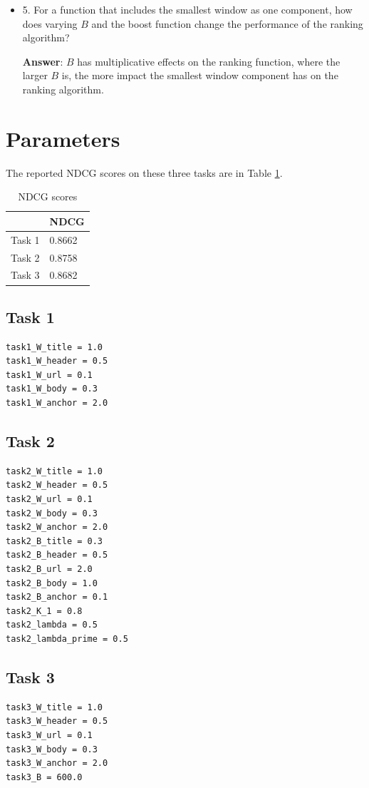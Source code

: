 \begin{itemize}
  
  \item[] 5. For a function that includes the smallest window as one component, how does varying $B$ and the boost function change the performance of the ranking algorithm?
  
  \textbf{Answer}: 
      $B$ has multiplicative effects on the ranking function, where the larger $B$ is, the more impact the smallest window component has on the ranking algorithm.
\end{itemize}

\section{Parameters}

The reported NDCG scores on these three tasks are in Table \ref{tab:ndcg}.
\begin{table}[h!]
\begin{center}
\begin{tabular}{|l|l|}
  \hline
   & NDCG \\
  \hline
  Task 1 & 0.8662 \\
  Task 2 & 0.8758 \\
  Task 3 & 0.8682 \\
  \hline
\end{tabular}
  \caption{NDCG scores}\label{tab:ndcg}
\end{center}
\end{table}

\subsection{Task 1}
\begin{verbatim}
task1_W_title = 1.0
task1_W_header = 0.5
task1_W_url = 0.1
task1_W_body = 0.3
task1_W_anchor = 2.0
\end{verbatim}

\subsection{Task 2}
\begin{verbatim}
task2_W_title = 1.0
task2_W_header = 0.5
task2_W_url = 0.1
task2_W_body = 0.3
task2_W_anchor = 2.0
task2_B_title = 0.3
task2_B_header = 0.5
task2_B_url = 2.0
task2_B_body = 1.0
task2_B_anchor = 0.1
task2_K_1 = 0.8
task2_lambda = 0.5
task2_lambda_prime = 0.5 
\end{verbatim}


\subsection{Task 3}
\begin{verbatim}
task3_W_title = 1.0
task3_W_header = 0.5
task3_W_url = 0.1
task3_W_body = 0.3
task3_W_anchor = 2.0
task3_B = 600.0
\end{verbatim}





